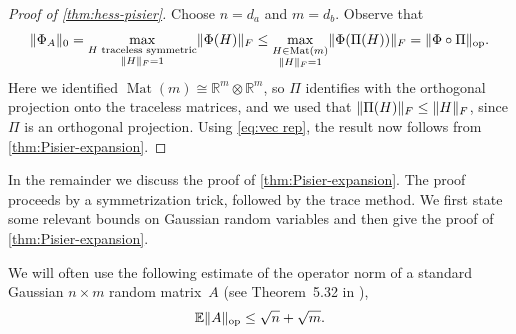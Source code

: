 \documentclass[aos]{imsart}
\theoremstyle{definition}
\numberwithin{equation}{section}
\DeclareMathOperator{\op}{op}
\DeclareMathOperator{\Mat}{Mat}
\DeclarePairedDelimiter{\norm}{\lVert}{\rVert}
\newcommand{\R}{{\mathbb{R}}}
\newcommand{\ot}{\otimes}
\newcommand{\E}{\mathbb{E}}
\newcommand{\MW}[1]{{\color{red}[MW: #1]}}
\newcommand{\MW}[1]{{}}
\begin{document}
\begin{appendix}
\begin{proof}[Proof of \cref{thm:hess-pisier}]
Choose $n=d_a$ and $m=d_b$.
Observe that
\begin{align*}
  \norm{\Phi_A}_0
= \max_{\substack{H \text{ traceless symmetric} \\ \norm H_F=1}} \norm{\Phi(H)}_F
\leq %
\max_{\substack{H \in \Mat(m) \\ \norm H_F = 1}} \norm{\Phi(\Pi(H))}_F
= \norm{\Phi \circ \Pi}_{\op}.
\end{align*}
Here we identified $\Mat(m) \cong \R^m \ot \R^m$, so $\Pi$ identifies with the orthogonal projection onto the traceless matrices, and we used that $\norm{\Pi(H)}_F \leq \norm{H}_F$, since $\Pi$ is an orthogonal projection.
Using \cref{eq:vec rep}, the result now follows from \cref{thm:Pisier-expansion}.
\end{proof}

In the remainder we discuss the proof of \cref{thm:Pisier-expansion}.
The proof proceeds by a symmetrization trick, followed by the trace method.
We first state some relevant bounds on Gaussian random variables and then give the proof of \cref{thm:Pisier-expansion}.

We will often use the following estimate of the operator norm of a standard Gaussian $n \times m$ random matrix~$A$ (see Theorem~5.32 in \cite{vershynin2010introduction}),
\begin{equation}\label{eq:op norm upper bound}
  \E \norm{A}_{\op} \leq \sqrt{n} + \sqrt{m}  .
\end{equation}


\end{appendix}
\end{document}
